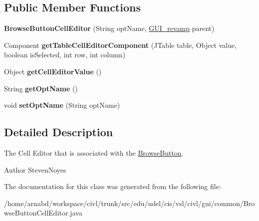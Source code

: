 \subsection*{Public Member Functions}
\begin{DoxyCompactItemize}
\item 
\hypertarget{classedu_1_1udel_1_1cis_1_1vsl_1_1civl_1_1gui_1_1common_1_1BrowseButtonCellEditor_ada110e90ba5f889a3d1fbc86ea0bc239}{}{\bfseries Browse\+Button\+Cell\+Editor} (String opt\+Name, \hyperlink{classedu_1_1udel_1_1cis_1_1vsl_1_1civl_1_1gui_1_1common_1_1GUI__revamp}{G\+U\+I\+\_\+revamp} parent)\label{classedu_1_1udel_1_1cis_1_1vsl_1_1civl_1_1gui_1_1common_1_1BrowseButtonCellEditor_ada110e90ba5f889a3d1fbc86ea0bc239}

\item 
\hypertarget{classedu_1_1udel_1_1cis_1_1vsl_1_1civl_1_1gui_1_1common_1_1BrowseButtonCellEditor_ae48633ca189b5bec1564bfa7b2fbe0f1}{}Component {\bfseries get\+Table\+Cell\+Editor\+Component} (J\+Table table, Object value, boolean is\+Selected, int row, int column)\label{classedu_1_1udel_1_1cis_1_1vsl_1_1civl_1_1gui_1_1common_1_1BrowseButtonCellEditor_ae48633ca189b5bec1564bfa7b2fbe0f1}

\item 
\hypertarget{classedu_1_1udel_1_1cis_1_1vsl_1_1civl_1_1gui_1_1common_1_1BrowseButtonCellEditor_ace2027ab77343ebaed32198129426eb6}{}Object {\bfseries get\+Cell\+Editor\+Value} ()\label{classedu_1_1udel_1_1cis_1_1vsl_1_1civl_1_1gui_1_1common_1_1BrowseButtonCellEditor_ace2027ab77343ebaed32198129426eb6}

\item 
\hypertarget{classedu_1_1udel_1_1cis_1_1vsl_1_1civl_1_1gui_1_1common_1_1BrowseButtonCellEditor_ad8edeb8453a299df1f46b9246cd93d9b}{}String {\bfseries get\+Opt\+Name} ()\label{classedu_1_1udel_1_1cis_1_1vsl_1_1civl_1_1gui_1_1common_1_1BrowseButtonCellEditor_ad8edeb8453a299df1f46b9246cd93d9b}

\item 
\hypertarget{classedu_1_1udel_1_1cis_1_1vsl_1_1civl_1_1gui_1_1common_1_1BrowseButtonCellEditor_af63456774cd23fa764e13531415f1d2b}{}void {\bfseries set\+Opt\+Name} (String opt\+Name)\label{classedu_1_1udel_1_1cis_1_1vsl_1_1civl_1_1gui_1_1common_1_1BrowseButtonCellEditor_af63456774cd23fa764e13531415f1d2b}

\end{DoxyCompactItemize}


\subsection{Detailed Description}
The Cell Editor that is associated with the \hyperlink{classedu_1_1udel_1_1cis_1_1vsl_1_1civl_1_1gui_1_1common_1_1BrowseButton}{Browse\+Button}. 

\begin{DoxyAuthor}{Author}
Steven\+Noyes 
\end{DoxyAuthor}


The documentation for this class was generated from the following file\+:\begin{DoxyCompactItemize}
\item 
/home/arnabd/workspace/civl/trunk/src/edu/udel/cis/vsl/civl/gui/common/Browse\+Button\+Cell\+Editor.\+java\end{DoxyCompactItemize}
